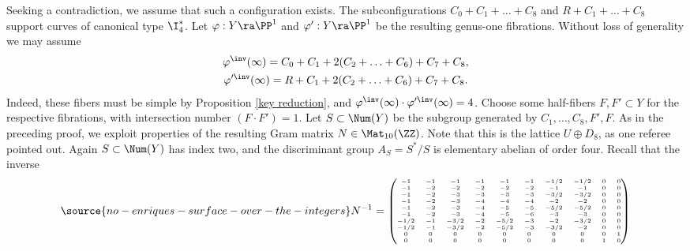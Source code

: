 \proof
Seeking a contradiction, we assume that such a configuration exists.
The subconfigurations  $C_0+C_1+\ldots+C_8$ and $R+C_1+\ldots+C_8$ support
curves of canonical type $\I_4^*$. Let $\varphi:Y\ra \PP^1$ and $\varphi':Y\ra\PP^1$
be the resulting genus-one fibrations. Without loss of generality we may assume
\begin{gather*}
\varphi^\inv(\infty) = C_0+C_1+2(C_2+\ldots+C_6)+C_7+C_8,\\
\varphi'^\inv(\infty) = R+C_1+2(C_2+\ldots+C_6)+C_7+C_8.
\end{gather*}
Indeed, these fibers must be simple by Proposition \ref{key reduction}, and   $\varphi^\inv(\infty)\cdot \varphi'^\inv(\infty)=4$.
Choose some half-fibers $F,F'\subset Y$ for the respective fibrations, with intersection number  $(F\cdot F')=1$.
Let $S\subset \Num(Y)$ be the subgroup generated by $C_1,\ldots,C_8,F',F$.
As in the preceding proof, we exploit   properties of the resulting Gram matrix $N\in\Mat_{10}(\ZZ)$.
Note that this is the lattice $U\oplus D_8$, as one referee pointed out.
%
%
%
%
%
Again    $S\subset \Num(Y)$ has index two, and the discriminant   group $A_S=S^*/S$  is elementary abelian of order four.
Recall that the inverse
\begin{equation}
\label{gram matrix second}
\source{no-enriques-surface-over-the-integers}
N^{-1}=
{\tiny
\begin{pmatrix}
-1   &-1   &-1   &-1   &-1   &-1 &-1/2 &-1/2    &0    &0\\
-1   &-2   &-2   &-2   &-2   &-2   &-1   &-1    &0    &0\\
-1   &-2   &-3   &-3   &-3   &-3 &-3/2 &-3/2    &0    &0\\
-1   &-2   &-3   &-4   &-4   &-4   &-2   &-2    &0    &0\\
-1   &-2   &-3   &-4   &-5   &-5 &-5/2 &-5/2    &0    &0\\
-1   &-2   &-3   &-4   &-5   &-6   &-3   &-3    &0    &0\\
-1/2 &-1 &-3/2   &-2 &-5/2   &-3   &-2 &-3/2    &0    &0\\
-1/2 &-1 &-3/2   &-2 &-5/2   &-3 &-3/2   &-2    &0    &0\\
0    &0    &0    &0    &0    &0    &0    &0     &0    &1\\
0    &0    &0    &0    &0    &0    &0    &0     &1    &0\\
\end{pmatrix}
}
\end{equation}
